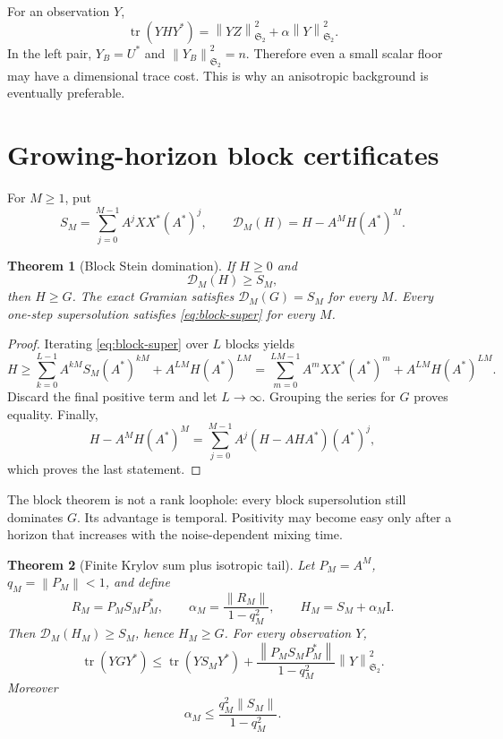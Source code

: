 \documentclass[11pt]{article}
\newtheorem{theorem}{Theorem}[section]
\theoremstyle{definition}
\theoremstyle{remark}
\newcommand{\Id}{\mathrm I}
\newcommand{\cD}{\mathcal D}
\newcommand{\HS}{\mathfrak S_2}
\newcommand{\tr}{\operatorname{tr}}
\newcommand{\norm}[1]{\left\lVert #1\right\rVert}
\begin{document}
For an observation \(Y\),
\begin{equation}
 \tr(YHY^*)=\norm{YZ}_{\HS}^2+\alpha\norm Y_{\HS}^2.
 \label{eq:floor-cost}
\end{equation}
In the left pair, \(Y_B=U^*\) and \(\norm{Y_B}_{\HS}^2=n\).
Therefore even a small scalar floor may have a dimensional trace cost.
This is why an anisotropic background is eventually preferable.

\section{Growing-horizon block certificates}

For \(M\ge1\), put
\begin{equation}
 S_M=\sum_{j=0}^{M-1}A^jXX^*(A^*)^j,
 \qquad
 \cD_M(H)=H-A^MH(A^*)^M.
 \label{eq:block-definitions}
\end{equation}

\begin{theorem}[Block Stein domination]
\label{thm:block}
If \(H\ge0\) and
\begin{equation}
 \cD_M(H)\ge S_M,
 \label{eq:block-super}
\end{equation}
then \(H\ge G\).  The exact Gramian satisfies
\(\cD_M(G)=S_M\) for every \(M\).  Every one-step supersolution satisfies
\eqref{eq:block-super} for every \(M\).
\end{theorem}

\begin{proof}
Iterating \eqref{eq:block-super} over \(L\) blocks yields
\[
 H\ge
 \sum_{k=0}^{L-1}A^{kM}S_M(A^*)^{kM}
 +A^{LM}H(A^*)^{LM}
 =
 \sum_{m=0}^{LM-1}A^mXX^*(A^*)^m
 +A^{LM}H(A^*)^{LM}.
\]
Discard the final positive term and let \(L\to\infty\).  Grouping the
series for \(G\) proves equality.  Finally,
\[
 H-A^MH(A^*)^M
 =\sum_{j=0}^{M-1}A^j(H-AHA^*)(A^*)^j,
\]
which proves the last statement.
\end{proof}

The block theorem is not a rank loophole: every block supersolution still
dominates \(G\).  Its advantage is temporal.  Positivity may become easy
only after a horizon that increases with the noise-dependent mixing time.

\begin{theorem}[Finite Krylov sum plus isotropic tail]
\label{thm:isotropic}
Let \(P_M=A^M\), \(q_M=\norm{P_M}<1\), and define
\begin{equation}
 R_M=P_MS_MP_M^*,
 \qquad
 \alpha_M=\frac{\norm{R_M}}{1-q_M^2},
 \qquad
 H_M=S_M+\alpha_M\Id.
 \label{eq:HM}
\end{equation}
Then \(\cD_M(H_M)\ge S_M\), hence \(H_M\ge G\).  For every observation
\(Y\),
\begin{equation}
 \boxed{
 \tr(YGY^*)
 \le
 \tr(YS_MY^*)
 +\frac{\norm{P_MS_MP_M^*}}{1-q_M^2}\norm Y_{\HS}^2.}
 \label{eq:block-energy}
\end{equation}
Moreover
\[
 \alpha_M\le\frac{q_M^2\norm{S_M}}{1-q_M^2}.
\]
\end{theorem}
\end{document}
